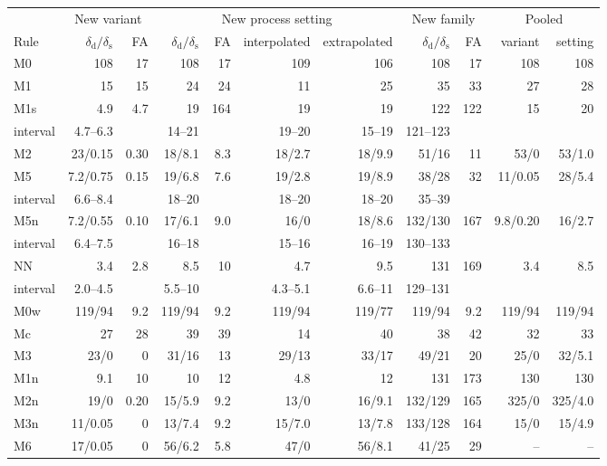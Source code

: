 \documentclass[pdflatex,sn-basic,lineno]{sn-jnl} %
\begin{document}
\begin{table}[t]
\begin{tabular}{@{}lrrrrrrrrrr@{}}
\toprule
 & \multicolumn{2}{c}{New variant} & \multicolumn{4}{c}{New process setting} & \multicolumn{2}{c}{New family} & \multicolumn{2}{c}{Pooled} \\
\cmidrule(lr){2-3}\cmidrule(lr){4-7}\cmidrule(lr){8-9}\cmidrule(lr){10-11}
Rule & $\delta_\mathrm{d}/\delta_\mathrm{s}$ & FA & $\delta_\mathrm{d}/\delta_\mathrm{s}$ & FA & interpolated & extrapolated & $\delta_\mathrm{d}/\delta_\mathrm{s}$ & FA & variant & setting \\
\midrule
M0 & 108 & 17 & 108 & 17 & 109 & 106 & 108 & 17 & 108 & 108 \\
M1 & 15 & 15 & 24 & 24 & 11 & 25 & 35 & 33 & 27 & 28 \\
M1s & 4.9 & 4.7 & 19 & 164 & 19 & 19 & 122 & 122 & 15 & 20 \\
\quad interval & 4.7--6.3 &  & 14--21 &  & 19--20 & 15--19 & 121--123 &  &  & \\
M2 & 23/0.15 & 0.30 & 18/8.1 & 8.3 & 18/2.7 & 18/9.9 & 51/16 & 11 & 53/0 & 53/1.0 \\
M5 & 7.2/0.75 & 0.15 & 19/6.8 & 7.6 & 19/2.8 & 19/8.9 & 38/28 & 32 & 11/0.05 & 28/5.4 \\
\quad interval & 6.6--8.4 &  & 18--20 &  & 18--20 & 18--20 & 35--39 &  &  & \\
M5n & 7.2/0.55 & 0.10 & 17/6.1 & 9.0 & 16/0 & 18/8.6 & 132/130 & 167 & 9.8/0.20 & 16/2.7 \\
\quad interval & 6.4--7.5 &  & 16--18 &  & 15--16 & 16--19 & 130--133 &  &  & \\
NN & 3.4 & 2.8 & 8.5 & 10 & 4.7 & 9.5 & 131 & 169 & 3.4 & 8.5 \\
\quad interval & 2.0--4.5 &  & 5.5--10 &  & 4.3--5.1 & 6.6--11 & 129--131 &  &  & \\
\midrule M0w & 119/94 & 9.2 & 119/94 & 9.2 & 119/94 & 119/77 & 119/94 & 9.2 & 119/94 & 119/94 \\
Mc & 27 & 28 & 39 & 39 & 14 & 40 & 38 & 42 & 32 & 33 \\
M3 & 23/0 & 0 & 31/16 & 13 & 29/13 & 33/17 & 49/21 & 20 & 25/0 & 32/5.1 \\
M1n & 9.1 & 10 & 10 & 12 & 4.8 & 12 & 131 & 173 & 130 & 130 \\
M2n & 19/0 & 0.20 & 15/5.9 & 9.2 & 13/0 & 16/9.1 & 132/129 & 165 & 325/0 & 325/4.0 \\
M3n & 11/0.05 & 0 & 13/7.4 & 9.2 & 15/7.0 & 13/7.8 & 133/128 & 164 & 15/0 & 15/4.9 \\
M6 & 17/0.05 & 0 & 56/6.2 & 5.8 & 47/0 & 56/8.1 & 41/25 & 29 & -- & -- \\

\end{tabular}
\end{table}
\end{document}
